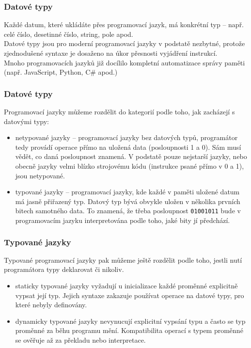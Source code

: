\documentclass[aspectratio=169,11pt,svgnames]{beamer}
\begin{document}
\begin{frame}
 \frametitle{Datové typy}
 Každé datum, které ukládáte přes programovací jazyk, má konkrétní \alert{typ}
 -- např. celé číslo, desetinné číslo, string, pole apod.\\
 \pause
 Datové typy jsou pro moderní programovací jazyky v podstatě nezbytné, protože
 zjednodušené syntaxe je dosaženo na úkor přesnosti vyjádření instrukcí.\\
 \pause
 Mnoho programovacích jazyků již docílilo kompletní automatizace správy paměti
 (např. JavaScript, Python, C\# apod.)
\end{frame}

\begin{frame}
 \frametitle{Datové typy}
 Programovací jazyky můžeme rozdělit do kategorií podle toho, jak zacházejí s
 datovými typy:
 \pause
 \begin{itemize}
  \item \alert{netypované jazyky} -- programovací jazyky \alert{bez datových
  typů}, programátor tedy provádí operace přímo na uložená data (posloupnosti 1
  a 0). Sám musí vědět, co daná posloupnost znamená. V podstatě pouze nejstarší
  jazyky, nebo obecně jazyky velmi blízko strojovému kódu (instrukce psané přímo
  v 0 a 1), jsou netypované.
 \pause
 \item \alert{typované jazyky} -- programovací jazyky, kde každé v paměti
  uložené datum má jasně přiřazený typ. Datový typ bývá obvykle uložen v
  několika prvních bitech samotného data. To znamená, že třeba posloupnost
  \texttt{01001011} bude v programovacím jazyku interpretována podle toho, jaké
  bity jí předchází.
 \end{itemize}
\end{frame}

\begin{frame}
 \frametitle{Typované jazyky}
 Typované programovací jazyky pak můžeme ještě rozdělit podle toho, jestli nutí
 programátora typy deklarovat či nikoliv.
 \pause
 \begin{itemize}
  \item \alert{staticky typované} jazyky vyžadují u inicializace každé proměnné
   explicitně vypsat její typ. Jejich syntaxe zakazuje používat operace na
   datové typy, pro které nebyly definovány.
  \pause
  \item \alert{dynamicky typované} jazyky nevynucují explicitní vypsání typu a
   často se typ proměnné za běhu programu mění. Kompatibilita operací s typem
   proměnné se ověřuje až za překladu nebo interpretace.
 \end{itemize}
\end{frame}
\end{document}
